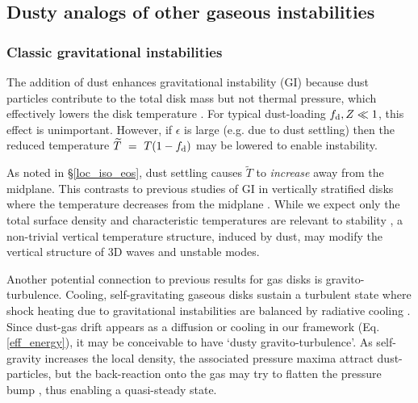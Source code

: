 



\subsection{Dusty analogs of other gaseous instabilities} \label{dust_analogs} 


\subsubsection{Classic gravitational instabilities} %
The addition of dust enhances gravitational
instability (GI) because dust particles contribute to the
total disk mass but not thermal pressure, which effectively lowers the
disk temperature \citep[][]{thompson88,shi13}. For typical dust-loading 
$f_\mathrm{d}, Z\ll1$, this effect is unimportant. However, if $\epsilon$ is
large (e.g. due to dust settling) then the reduced temperature
$\widetilde{T}~=~T(1 - f_\mathrm{d})$ may be lowered to enable instability.  

As noted in \S\ref{loc_iso_eos}, dust settling causes 
$\widetilde{T}$ to \emph{increase} away from the midplane. This contrasts
to previous studies of GI in vertically stratified disks
 where the temperature decreases
from the midplane \citep[e.g.][]{mamat10, kim12,lin14c}. 
While we expect only the total surface density and
characteristic temperatures are relevant to stability  
\citep{toomre64}, a non-trivial vertical temperature
structure, induced by dust, may modify the vertical structure of 3D
waves and unstable modes. 

Another potential connection to previous results for gas disks is  
gravito-turbulence. Cooling, self-gravitating gaseous disks 
sustain a turbulent state where shock heating due to gravitational 
instabilities are balanced by radiative cooling 
\citep{gammie01}. Since dust-gas drift appears as a diffusion or 
cooling in our framework (Eq. \ref{eff_energy}), it may be conceivable
to have `dusty gravito-turbulence'. As self-gravity increases the
local density, the associated pressure maxima attract dust-particles,
but the back-reaction onto the gas may try to flatten the pressure
bump \citep{taki16}, thus enabling a quasi-steady state. 

